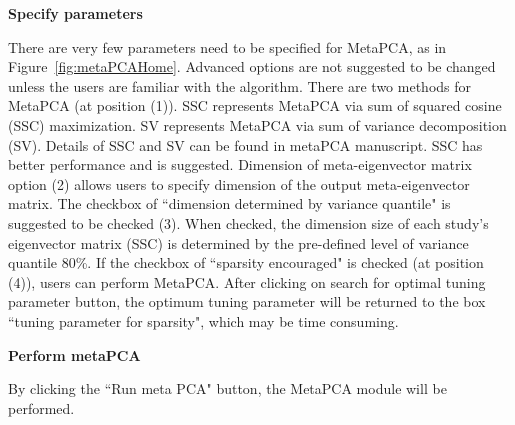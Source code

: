 \begin{steps}

\item \textbf{Specify parameters} 

There are very few parameters need to be specified for MetaPCA, as in Figure~\ref{fig:metaPCAHome}.
Advanced options are not suggested to be changed unless the users are familiar with the algorithm.
There are two methods for MetaPCA (at position {\color{red} (1)}). 
SSC represents MetaPCA via sum of squared cosine (SSC) maximization.
SV represents MetaPCA via sum of variance decomposition (SV).
Details of SSC and SV can be found in metaPCA manuscript.
SSC has better performance and is suggested.
Dimension of meta-eigenvector matrix option {\color{red} (2)} allows users to specify dimension of the output meta-eigenvector matrix.
The checkbox of ``dimension determined by variance quantile" is suggested to be checked {\color{red} (3)}.
When checked, the dimension size of each study's eigenvector matrix (SSC) is determined  by the pre-defined level of variance quantile 80\%.
If the checkbox of ``sparsity encouraged" is checked (at position {\color{red} (4)}), users can perform MetaPCA.
After clicking on search for optimal tuning parameter button, the optimum tuning parameter will be returned to the box ``tuning parameter for sparsity", 
which may be time consuming.

\item \textbf{Perform metaPCA} 

By clicking the ``Run meta PCA" button, the MetaPCA module will be performed.


\end{steps}

